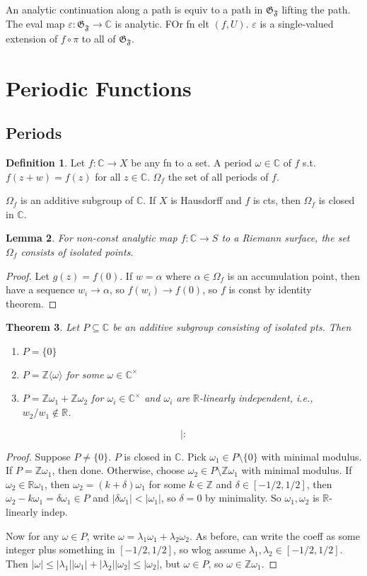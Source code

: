 \documentclass{article}
\theoremstyle{definition}
\newtheorem{defn}{Definition}[section]
\theoremstyle{remark}
\theoremstyle{plain}
\newtheorem{lem}[defn]{Lemma}
\newtheorem{thm}[defn]{Theorem}
\newcommand{\ZZ}{\mathbb{Z}}
\newcommand{\RR}{\mathbb{R}}
\newcommand{\CC}{\mathbb{C}}
\newcommand{\e}{\varepsilon}
\begin{document}
An analytic continuation along a path is equiv to a path in $\mathfrak G_{\mathfrak F}$ lifting the path. The eval map $\e:\mathfrak G_{\mathfrak F}\to\CC$ is analytic. FOr fn elt $(f,U)$. $\e$ is a single-valued extension of $f\circ\pi$ to all of $\mathfrak G_{\mathfrak F}$.

\section{Periodic Functions}
\subsection{Periods}
\begin{defn}
    Let $f:\CC\to X$ be any fn to a set. A period $\omega\in\CC$ of $f$ s.t. $f(z+w)=f(z)$ for all $z\in\CC$. $\Omega_f$ the set of all periods of $f$.
\end{defn}
$\Omega_f$ is an additive subgroup of $\CC$. If $X$ is Hausdorff and $f$ is cts, then $\Omega_f$ is closed in $\CC$.
\begin{lem}
    For non-const analytic map $f:\CC\to S$ to a Riemann surface, the set $\Omega_f$ consists of isolated points.
\end{lem}
\begin{proof}
    Let $g(z)=f(0)$. If $w=\alpha$ where $\alpha\in\Omega_f$ is an accumulation point, then have a sequence $w_i\to\alpha$, so $f(w_i)\to f(0)$, so $f$ is const by identity theorem.
\end{proof}
\begin{thm}
    Let $P\subseteq\CC$ be an additive subgroup consisting of isolated pts. Then
    \begin{enumerate}
        \item[(0)] $P=\{0\}$
        \item[(1)] $P=\ZZ\langle\omega\rangle$ for some $\omega\in\CC^\times$
        \item[(2)] $P=\ZZ\omega_1+\ZZ\omega_2$ for $\omega_i\in\CC^\times$ and $\omega_i$ are $\RR$-linearly independent, i.e., $w_2/w_1\notin\RR$.
    \end{enumerate}
\end{thm}
\[\vert:\tag{Owen's Signature}\]
\begin{proof}
    Suppose $P\neq\{0\}$. $P$ is closed in $\CC$. Pick $\omega_1\in P\setminus\{0\}$ with minimal modulus. If $P=\ZZ\omega_1$, then done. Otherwise, choose $\omega_2\in P\setminus\ZZ\omega_1$ with minimal modulus. If $\omega_2\in\RR\omega_1$, then $\omega_2=(k+\delta)\omega_1$ for some $k\in\ZZ$ and $\delta\in[-1/2,1/2]$, then $\omega_2-k\omega_1=\delta\omega_1\in P$ and $|\delta\omega_1|<|\omega_1|$, so $\delta=0$ by minimality. So $\omega_1,\omega_2$ is $\RR$-linearly indep.

    Now for any $\omega\in P$, write $\omega=\lambda_1\omega_1+\lambda_2\omega_2$. As before, can write the coeff as some integer plus something in $[-1/2,1/2]$, so wlog assume $\lambda_1,\lambda_2\in [-1/2,1/2]$. Then $|\omega|\le |\lambda_1||\omega_1|+|\lambda_2||\omega_2|\le |\omega_2|$, but $\omega\in P$, so $\omega\in \ZZ\omega_1$.
\end{proof}
\end{document}
